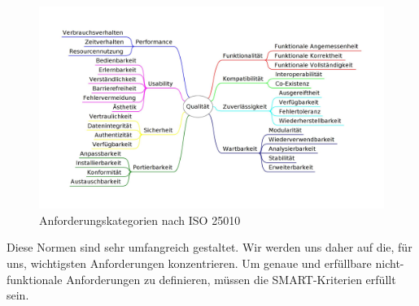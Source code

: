 \begin{figure}[h]
	\centering
	\includegraphics[width=1\linewidth]{img/anforderungen/quality}
	\caption[Anforderungskategorien nach ISO 25010]{Anforderungskategorien nach  ISO 25010}
	\label{fig:ISO 25010}
\end{figure}


Diese Normen sind sehr umfangreich gestaltet. Wir werden uns daher auf die, für uns, wichtigsten Anforderungen konzentrieren. Um genaue und erfüllbare nicht-funktionale Anforderungen zu definieren, müssen die SMART-Kriterien \cite{SMART} erfüllt sein. 

